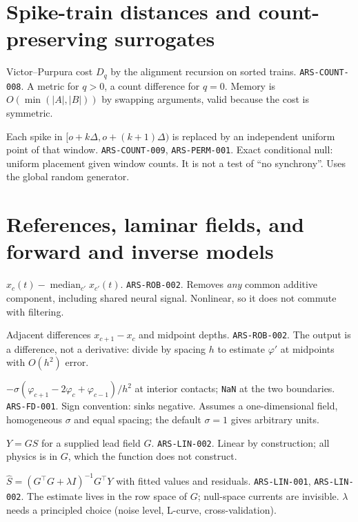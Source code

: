 \section{Spike-train distances and count-preserving surrogates}
{Victor--Purpura cost $D_q$ by the alignment recursion on sorted trains.}
{\texttt{ARS-COUNT-008}.}
{A metric for $q>0$, a count difference for $q=0$. Memory is $O(\min(|A|,|B|))$ by swapping arguments, valid because the cost is symmetric.}

{Each spike in $[o+k\Delta,o+(k+1)\Delta)$ is replaced by an independent uniform point of that window.}
{\texttt{ARS-COUNT-009}, \texttt{ARS-PERM-001}.}
{Exact conditional null: uniform placement given window counts. It is not a test of ``no synchrony''. Uses the global random generator.}

\section{References, laminar fields, and forward and inverse models}
{$x_c(t)-\operatorname{median}_{c'}x_{c'}(t)$.}
{\texttt{ARS-ROB-002}.}
{Removes \emph{any} common additive component, including shared neural signal. Nonlinear, so it does not commute with filtering.}

{Adjacent differences $x_{c+1}-x_c$ and midpoint depths.}
{\texttt{ARS-ROB-002}.}
{The output is a difference, not a derivative: divide by spacing $h$ to estimate $\varphi'$ at midpoints with $O(h^2)$ error.}

{$-\sigma(\varphi_{c+1}-2\varphi_c+\varphi_{c-1})/h^2$ at interior contacts; \texttt{NaN} at the two boundaries.}
{\texttt{ARS-FD-001}.}
{Sign convention: sinks negative. Assumes a one-dimensional field, homogeneous $\sigma$ and equal spacing; the default $\sigma=1$ gives arbitrary units.}

{$Y=GS$ for a supplied lead field $G$.}
{\texttt{ARS-LIN-002}.}
{Linear by construction; all physics is in $G$, which the function does not construct.}

{$\hat S=(G^\top G+\lambda I)^{-1}G^\top Y$ with fitted values and residuals.}
{\texttt{ARS-LIN-001}, \texttt{ARS-LIN-002}.}
{The estimate lives in the row space of $G$; null-space currents are invisible. $\lambda$ needs a principled choice (noise level, L-curve, cross-validation).}

